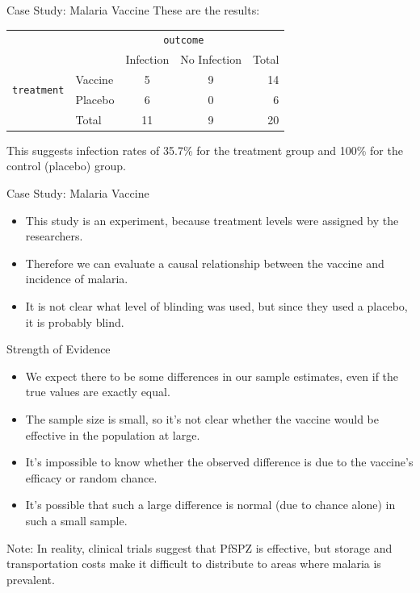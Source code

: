 \begin{frame}{Case Study: Malaria Vaccine}
    These are the results:
    \begin{center}
        \begin{tabular}{r l cc r}
		& & \multicolumn{2}{c}{{\texttt{outcome}}} & \\
        \cline{3-5}
		& & Infection & No Infection & Total  \\ 
        \cline{2-5}
        \multirow{2}{*}{{\texttt{treatment}}} 
        & Vaccine & 5 & 9 & 14  \\ 
  		& Placebo & 6 & 0 & 6  \\ 
        \cline{2-5}
  		& Total	& 11 & 9 & 20  \\
        \cline{2-5}
    \end{tabular}
    \end{center}
    This suggests infection rates of 35.7\% for the treatment group and 100\% for the control (placebo) group.
\end{frame}

\begin{frame}{Case Study: Malaria Vaccine}
    \begin{itemize}
        \item This study is an experiment, because treatment levels were assigned by the researchers.
        \item Therefore we can evaluate a causal relationship between the vaccine and incidence of malaria.
        \item It is not clear what level of blinding was used, but since they used a placebo, it is probably blind.
    \end{itemize}
\end{frame}

\begin{frame}{Strength of Evidence}
    \begin{itemize}
        \item We expect there to be some differences in our sample estimates, even if the true values are exactly equal. 
        \item The sample size is small, so it's not clear whether the vaccine would be effective in the population at large.
        \item It's impossible to know whether the observed difference is due to the vaccine's efficacy or random chance.
        \item It's possible that such a large difference is normal (due to chance alone) in such a small sample.
    \end{itemize}
    \vspace{12pt}\small Note: In reality, clinical trials suggest that PfSPZ is effective, but storage and transportation costs make it difficult to distribute to areas where malaria is prevalent.
\end{frame}

